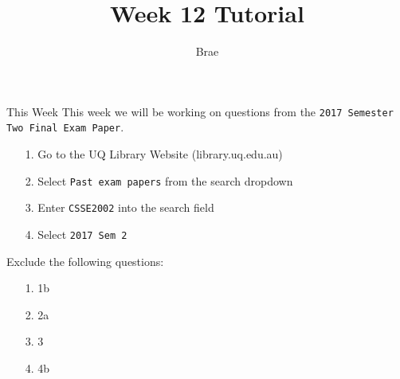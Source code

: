 

\title{Week 12 Tutorial}
\author{Brae}



\begin{frame}
\titlepage
\end{frame}

\begin{frame}[t, fragile]{This Week} \vspace{4pt}
This week we will be working on questions from the \texttt{2017 Semester Two Final Exam Paper}.\\[20pt]
\begin{enumerate}
	\item[1.] Go to the UQ Library Website (library.uq.edu.au)
	\item[2.] Select \texttt{Past exam papers} from the search dropdown
	\item[3.] Enter \texttt{CSSE2002} into the search field
	\item[4.] Select \texttt{2017 Sem 2}
\end{enumerate}

Exclude the following questions:
\begin{enumerate}
	\item[1.] 1b
	\item[2.] 2a
	\item[3.] 3
	\item[4.] 4b
\end{enumerate}
\end{frame}

